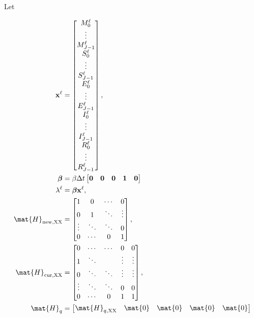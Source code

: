 \documentclass{jpmarticle}
\renewcommand{\vec}[1]{\boldsymbol{\mathrm{#1}}}
\let\subequationsorig\subequations%
\let\endsubequationsorig\endsubequations%
\renewenvironment{subequations}{
  \subequationsorig
  \renewcommand{\theequation}{\theparentequation.\arabic{equation}}
}{
  \endsubequationsorig
}
\begin{document}
Let
\begin{subequations}
  \begin{align}
    \vec{x}^{\ell} &=
    \begin{bmatrix}
      M_0^{\ell} \\ \vdots \\ M_{J - 1}^{\ell} \\
      S_0^{\ell} \\ \vdots \\ S_{J - 1}^{\ell} \\
      E_0^{\ell} \\ \vdots \\ E_{J - 1}^{\ell} \\
      I_0^{\ell} \\ \vdots \\ I_{J - 1}^{\ell} \\
      R_0^{\ell} \\ \vdots \\ R_{J - 1}^{\ell}
    \end{bmatrix},
    \\
    \vec{\beta} &=
    \beta \Delta t
    \begin{bmatrix}
      \vec{0} & \vec{0} & \vec{0} & \vec{1} & \vec{0}
    \end{bmatrix}
    \\
    \lambda^{\ell} &=
    \vec{\beta} \vec{x}^{\ell},
    \\
    \mat{H}_{\mathrm{new}, \mathrm{XX}} &=
    \begin{bmatrix}
      1 & 0 & \cdots & 0 \\
      0 & 1 & \ddots & \vdots \\
      \vdots & \ddots & \ddots & 0 \\
      0 & \cdots & 0 & 1
    \end{bmatrix},
    \\
    \mat{H}_{\mathrm{cur}, \mathrm{XX}} &=
    \begin{bmatrix}
      0 & \cdots & \cdots & 0 & 0 \\
      1 & \ddots & & \vdots & \vdots \\
      0 & \ddots & \ddots & \vdots & \vdots \\
      \vdots & \ddots & \ddots & 0 & 0 \\
      0 & \cdots & 0 & 1 & 1
    \end{bmatrix},
    \\
    \mat{H}_{q} &=
    \begin{bmatrix}
      \mat{H}_{q, \mathrm{XX}} & \mat{0} & \mat{0} & \mat{0} & \mat{0} \\

\end{bmatrix}
\end{align}
\end{subequations}
\end{document}
